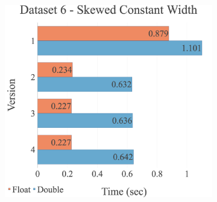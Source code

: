 \begin{figure}[H]
\begin{adjustwidth}{-2cm}{-2cm}
\begin{subfigure}{.62\textwidth}
\end{subfigure}
\par\bigskip
\par\bigskip
\centering
\begin{subfigure}{.62\textwidth}
  \includegraphics[width=1\textwidth]{img/experiments/option-versions-6_SKEWEDCONSTWIDTH.png}
\end{subfigure}
\end{adjustwidth}
\end{figure}


